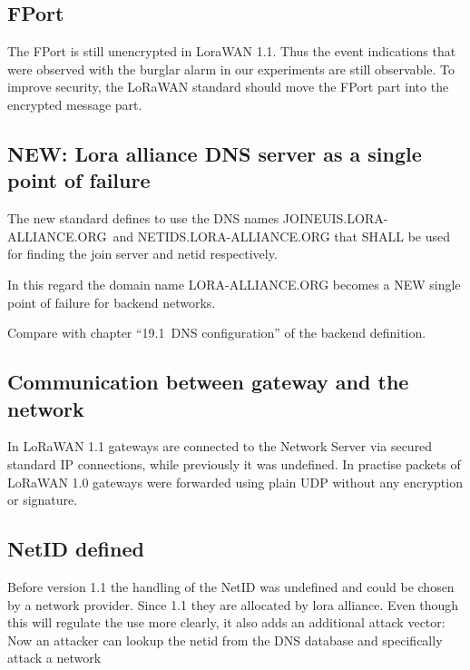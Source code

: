 {\hypertarget{h.i6r97yb5iafg}{\subsection{\texorpdfstring{{FPort}}{FPort}}\label{h.i6r97yb5iafg}}

{The FPort is still unencrypted in LoraWAN 1.1. Thus the event
indications that were observed with the burglar alarm in our experiments
are still observable. To improve security, the LoRaWAN standard should
move the FPort part into the encrypted message part.}

\hypertarget{h.mdrkurwqvvj8}{\subsection{\texorpdfstring{{NEW: Lora
alliance DNS server as a single point of
failure}}{NEW: Lora alliance DNS server as a single point of failure}}\label{h.mdrkurwqvvj8}}

{The new standard defines to use the DNS names
}{JOINEUIS.LORA-ALLIANCE.ORG}{~and }{NETIDS.LORA-ALLIANCE.ORG }{that
SHALL be used for finding the join server and netid respectively.}

{In this regard the domain name }{LORA-ALLIANCE.ORG }{becomes a }{NEW
single point of failure }{for backend networks.}

{Compare with chapter ``19.1}{~DNS configuration'' of the backend
definition.}

\hypertarget{h.mn1ux3159m0}{\subsection{\texorpdfstring{{Communication
between gateway and the
network}}{Communication between gateway and the network}}\label{h.mn1ux3159m0}}

{In LoRaWAN 1.1 gateways are connected to the Network Server via secured
standard IP connections, while previously it was undefined. In practise
packets of LoRaWAN 1.0 gateways were forwarded using plain UDP without
any encryption or signature.}

\hypertarget{h.jom2i6adwnnm}{\subsection{\texorpdfstring{{NetID
defined}}{NetID defined}}\label{h.jom2i6adwnnm}}

{Before version 1.1 the handling of the NetID was undefined and could be
chosen by a network provider. Since 1.1 they are allocated by lora
alliance. Even though this will regulate the use more clearly, it also
adds an additional attack vector: Now an attacker can lookup the netid
from the DNS database and specifically attack a network}

}
